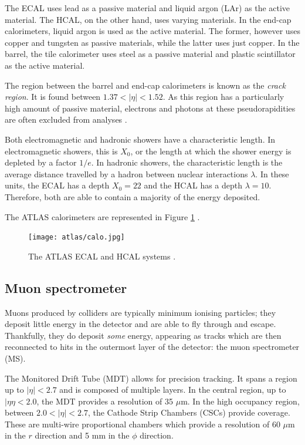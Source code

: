 \documentclass[10pt,a4paper]{book}
\begin{document}
The ECAL uses lead as a passive material and liquid argon (LAr) as the active material. The HCAL, on the other hand, uses varying materials. In the end-cap calorimeters, liquid argon is used as the active material. The former, however uses copper and tungsten as passive materials, while the latter uses just copper. In the barrel, the tile calorimeter uses steel as a passive material and plastic scintillator as the active material. 

The region between the barrel and end-cap calorimeters is known as the \emph{crack region}. It is found between $1.37 < \vert \eta \vert < 1.52$. As this region has a particularly high amount of passive material, electrons and photons at these pseudorapidities are often excluded from analyses \cite{Ducu:2024sgj}.

Both electromagnetic and hadronic showers have a characteristic length. In electromagnetic showers, this is $X_0$, or the length at which the shower energy is depleted by a factor $1/e$. In hadronic showers, the characteristic length is the average distance travelled by a hadron between nuclear interactions $\lambda$. In these units, the ECAL has a depth $X_0 = 22$ and the HCAL has a depth $\lambda = 10$. Therefore, both are able to contain a majority of the energy deposited.

The ATLAS calorimeters are represented in Figure \ref{calo} .

\begin{figure}
    \centering
    \texttt{[image: atlas/calo.jpg]}
    \caption{The ATLAS ECAL and HCAL systems \cite{Pequenao:1095927}.}
    \label{calo}
\end{figure}

\subsection{Muon spectrometer}

Muons produced by colliders are typically minimum ionising particles; they deposit little energy in the detector and are able to fly through and escape. Thankfully, they do deposit \emph{some} energy, appearing as tracks which are then reconnected to hits in the outermost layer of the detector: the muon spectrometer (MS). 

The Monitored Drift Tube (MDT) allows for precision tracking. It spans a region up to $\vert \eta \vert < 2.7$ and is composed of multiple layers. In the central region, up to $\vert \eta \eta < 2.0$, the MDT provides a resolution of 35 $\mu$m. In the high occupancy region, between $2.0 < \vert \eta \vert < 2.7$, the Cathode Strip Chambers (CSCs) provide coverage. These are multi-wire proportional chambers which provide a resolution of 60 $\mu$m in the $r$ direction and 5 mm in the $\phi$ direction. 
\end{document}
